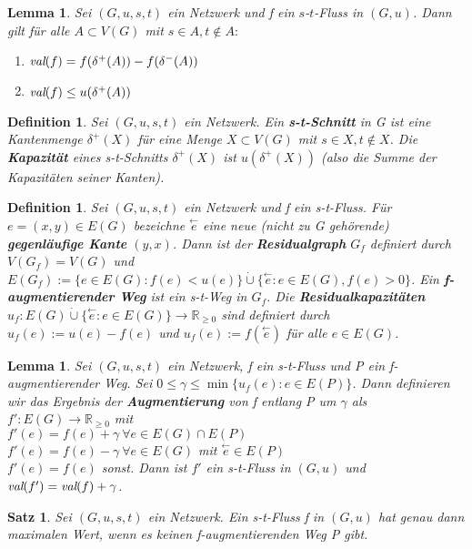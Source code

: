 \documentclass[12pt,a4paper]{article}
\theoremstyle{plain}
\newtheorem{Satz}[Theorem]{Satz}
\newtheorem{Lemma}[Theorem]{Lemma}
\newtheorem{Definition}[Theorem]{Definition}
\newcommand{\herv}[1]{{\emph{\textbf{#1}}}}
\newcommand{\R}{\mathbb{R}}
\newcommand{\cupdot}{\mathbin{\dot{\cup}}}
\numberwithin{equation}{section}
\begin{document}
\begin{Lemma}
Sei $(G,u,s,t)$ ein Netzwerk und f ein $s$-$t$-Fluss in $(G,u)$. Dann gilt für alle $A\subset V(G)$ mit $s\in A, t\not\in A:$
\begin{enumerate}
\renewcommand{\labelenumi}{\emph{(\alph{enumi})}}
\item $\emph{val}(f) = f(\delta^+(A))-f(\delta^-(A))$
\item $\emph{val}(f)\leq u(\delta^+(A))$
\end{enumerate}
\end{Lemma}
\begin{Definition}
Sei $(G,u,s,t)$ ein Netzwerk. Ein \herv{s-t-Schnitt} in G ist eine Kantenmenge $\delta^+(X)$ für eine Menge $X\subset V(G)$ mit $s\in X, t\not\in X$. Die \herv{Kapazität} eines s-t-Schnitts $\delta^+(X)$ ist $u(\delta^ +(X))$ (also die Summe der Kapazitäten seiner Kanten).
\end{Definition}
\begin{Definition}
Sei $(G,u,s,t)$ ein Netzwerk und f ein s-t-Fluss. Für $e=(x,y)\in E(G)$ bezeichne $\stackrel{\leftarrow}{e}$ eine neue (nicht zu G gehörende) \herv{gegenläufige Kante} $(y,x)$. Dann ist der \herv{Residualgraph} $G_f$ definiert durch $V(G_f)=V(G)$ und $E(G_f):=\{e\in E(G):f(e)<u(e)\} \cupdot \{\stackrel{\leftarrow}{e}:e\in E(G), f(e)>0\}$. Ein \textbf{f-}\herv{augmentierender Weg} ist ein s-t-Weg in $G_f$. Die \herv{Residualkapazitäten} $u_f:E(G)\cupdot \{\stackrel{\leftarrow}{e} :e\in E(G)\}\rightarrow \R_{\geq 0}$ sind definiert durch $u_f(e):=u(e)-f(e)$ und $u_f(e):=f(\stackrel{\leftarrow}{e})$ für alle $e\in E(G)$.
\end{Definition}
\begin{Lemma}
Sei $(G,u,s,t)$ ein Netzwerk, f ein s-t-Fluss und P ein f-augmentierender Weg. Sei $0\leq\gamma\leq\min\{u_f(e):e\in E(P)\}$. Dann definieren wir das Ergebnis der \herv{Augmentierung} von f entlang P um $\gamma$ als $f':E(G)\rightarrow \R_{\geq 0}$ mit \\$f'(e)=f(e)+\gamma\ \forall e\in E(G) \cap E(P)$\\
$f'(e)=f(e)-\gamma\ \forall e\in E(G)$ mit $\stackrel{\leftarrow}{e}\in E(P)$\\
$f'(e)=f(e)$ sonst. Dann ist $f'$ ein s-t-Fluss in $(G,u)$ und $\emph{val}(f')=\emph{val}(f)+\gamma$.
\end{Lemma}
\begin{Satz}
Sei $(G,u,s,t)$ ein Netzwerk. Ein s-t-Fluss f in $(G,u)$ hat genau dann maximalen Wert, wenn es keinen f-augmentierenden Weg P gibt.
\end{Satz}
\end{document}
